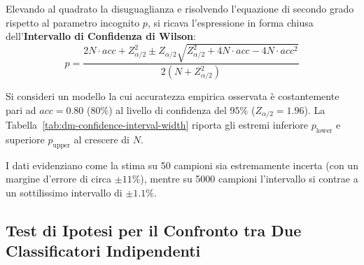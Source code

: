 Elevando al quadrato la disuguaglianza e risolvendo l'equazione di secondo grado rispetto al parametro incognito $p$, si ricava l'espressione in forma chiusa dell'\textbf{Intervallo di Confidenza di Wilson}:
\begin{equation}
    p = \frac{2 N \cdot acc + Z_{\alpha/2}^2 \pm Z_{\alpha/2} \sqrt{Z_{\alpha/2}^2 + 4 N \cdot acc - 4 N \cdot acc^2}}{2(N + Z_{\alpha/2}^2)}
    \label{eq:dm-wilson-confidence-interval}
\end{equation}

\begin{example}
Si consideri un modello la cui accuratezza empirica osservata è costantemente pari ad $acc = 0.80$ ($80\%$) al livello di confidenza del $95\%$ ($Z_{\alpha/2} = 1.96$). La Tabella~\ref{tab:dm-confidence-interval-width} riporta gli estremi inferiore $p_{\text{lower}}$ e superiore $p_{\text{upper}}$ al crescere di $N$.
\end{example}

\begin{table}[H]
\centering
\caption{Intervalli di confidenza al 95\% per un'accuratezza osservata dell'80\% al variare di $N$.}
\label{tab:dm-confidence-interval-width}
\vspace{2mm}
\end{table}

I dati evidenziano come la stima su 50 campioni sia estremamente incerta (con un margine d'errore di circa $\pm 11\%$), mentre su 5000 campioni l'intervallo si contrae a un sottilissimo intervallo di $\pm 1.1\%$.

\FloatBarrier
\subsection{Test di Ipotesi per il Confronto tra Due Classificatori Indipendenti}
\label{subsec:dm-two-models-hypothesis-test}

